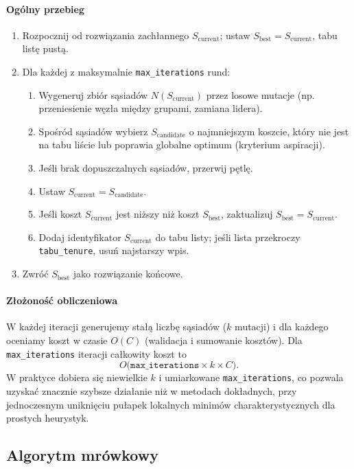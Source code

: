 \paragraph{Ogólny przebieg}  
\begin{enumerate}
  \item Rozpocznij od rozwiązania zachłannego $S_{\text{current}}$; ustaw $S_{\text{best}}=S_{\text{current}}$, tabu listę pustą.
  \item Dla każdej z maksymalnie \texttt{max\_iterations} rund:
    \begin{enumerate}
      \item Wygeneruj zbiór sąsiadów $N(S_{\text{current}})$ przez losowe mutacje (np. przeniesienie węzła między grupami, zamiana lidera).
      \item Spośród sąsiadów wybierz $S_{\text{candidate}}$ o najmniejszym koszcie, który nie jest na tabu liście lub poprawia globalne optimum (kryterium aspiracji).
      \item Jeśli brak dopuszczalnych sąsiadów, przerwij pętlę.
      \item Ustaw $S_{\text{current}} = S_{\text{candidate}}$.  
      \item Jeśli koszt $S_{\text{current}}$ jest niższy niż koszt $S_{\text{best}}$, zaktualizuj $S_{\text{best}} = S_{\text{current}}$.
      \item Dodaj identyfikator $S_{\text{current}}$ do tabu listy; jeśli lista przekroczy \texttt{tabu\_tenure}, usuń najstarszy wpis.
    \end{enumerate}
  \item Zwróć $S_{\text{best}}$ jako rozwiązanie końcowe.
\end{enumerate}

\paragraph{Złożoność obliczeniowa}  
W każdej iteracji generujemy stałą liczbę sąsiadów ($k$ mutacji) i dla każdego oceniamy koszt w czasie $O(C)$ (walidacja i sumowanie kosztów). Dla \texttt{max\_iterations} iteracji całkowity koszt to
\[
  O\bigl(\texttt{max\_iterations}\times k \times C\bigr).
\]
W praktyce dobiera się niewielkie $k$ i umiarkowane \texttt{max\_iterations}, co pozwala uzyskać znacznie szybsze działanie niż w metodach dokładnych, przy jednoczesnym uniknięciu pułapek lokalnych minimów charakterystycznych dla prostych heurystyk.  

\subsection{Algorytm mrówkowy}

